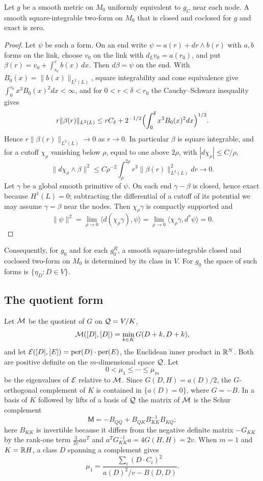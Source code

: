 \begin{lemma}\label{lem:uniqueness}
Let $g$ be a smooth metric on $M_0$ uniformly equivalent to $g_C$ near
each node. A smooth square-integrable two-form on $M_0$ that is closed
and coclosed for $g$ and exact is zero.
\end{lemma}
\begin{proof}
Let $\psi$ be such a form. On an end write $\psi=a(r)+dr\wedge b(r)$ with
$a,b$ forms on the link, choose $v_0$ on the link with
$d_Lv_0=a(r_0)$, and put $\beta(r)=v_0+\int_{r_0}^rb(x)\,dx$. Then
$d\beta=\psi$ on the end. With
$B_0(x)=\|b(x)\|_{L^2(L)}$, square integrability and cone equivalence give
$\int_0^{r_0}x^3B_0(x)^2dx<\infty$, and for $0<r<\delta<r_0$ the
Cauchy--Schwarz inequality gives
\[
 r\|\beta(r)\|_{L^2(L)}\le rC_\delta+2^{-1/2}
 \Bigl(\int_0^\delta x^3B_0(x)^2dx\Bigr)^{1/2}.
\]
Hence $r\|\beta(r)\|_{L^2(L)}\to0$ as $r\to0$. In particular $\beta$ is
square integrable, and for a cutoff $\chi_\rho$ vanishing below $\rho$,
equal to one above $2\rho$, with $|d\chi_\rho|\le C/\rho$,
\[
 \|d\chi_\rho\wedge\beta\|^2\le C\rho^{-2}\int_\rho^{2\rho}
 r^3\|\beta(r)\|^2_{L^2(L)}dr\longrightarrow0 .
\]
Let $\gamma$ be a global smooth primitive of $\psi$. On each end
$\gamma-\beta$ is closed, hence exact because $H^1(L)=0$; subtracting the
differential of a cutoff of its potential we may assume $\gamma=\beta$
near the nodes. Then $\chi_\rho\gamma$ is compactly supported and
\[
 \|\psi\|^2=\lim_{\rho\to0}\langle d(\chi_\rho\gamma),\psi\rangle
 =\lim_{\rho\to0}\langle\chi_\rho\gamma,d^*\psi\rangle=0 .
\]
\end{proof}

Consequently, for $g_0$ and for each $g_0^R$, a smooth square-integrable
closed and coclosed two-form on $M_0$ is determined by its class in $V$.
For $g_0$ the space of such forms is $\{\eta_D:D\in V\}$.

\subsection{The quotient form}
Let $\mathcal M$ be the quotient of $G$ on $\mathcal Q=V/K$,
\begin{equation}\label{eq:quotient-form}
 \mathcal M([D],[D])=\min_{k\in K}G(D+k,D+k),
\end{equation}
and let $\mathcal E([D],[E])=\operatorname{per}(D)\cdot \operatorname{per}(E)$, the Euclidean inner product in
$\mathbb R^N$. Both are positive definite on the $m$-dimensional space $\mathcal Q$.
Let
\[
 0<\mu_1\le\cdots\le\mu_m
\]
be the eigenvalues of $\mathcal E$ relative to $\mathcal M$. Since $G(D,H)=a(D)/2$, the
$G$-orthogonal complement of $K$ is contained in $\{a(D)=0\}$, where
$G=-B$. In a basis of $K$ followed by lifts of a basis of $\mathcal Q$ the
matrix of $\mathcal M$ is the Schur complement
\begin{equation}\label{eq:schur}
 \mathsf M=-B_{QQ}+B_{QK}B_{KK}^{-1}B_{KQ};
\end{equation}
here $B_{KK}$ is invertible because it differs from the negative definite
matrix $-G_{KK}$ by the rank-one term $\tfrac3{2v}aa^{T}$ and
$a^{T}G_{KK}^{-1}a=4G(H,H)=2v$. When $m=1$ and $K=\mathbb R H$, a class $D$
spanning a complement gives
\begin{equation}\label{eq:rank-one}
 \mu_1=\frac{\sum_i(D\cdot C_i)^2}{a(D)^2/v-B(D,D)} .
\end{equation}
